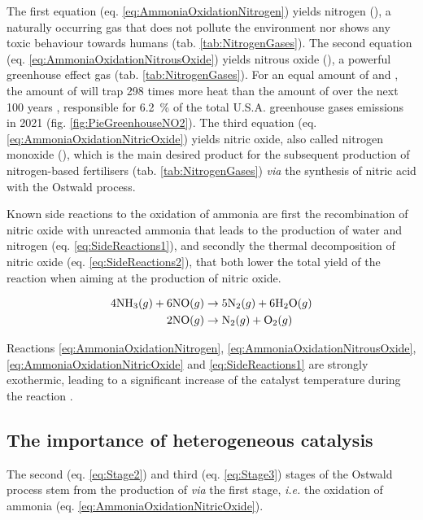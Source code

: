 The first equation (eq. \ref{eq:AmmoniaOxidationNitrogen}) yields nitrogen (\nitrogen), a naturally occurring gas that does not pollute the environment nor shows any toxic behaviour towards humans (tab. \ref{tab:NitrogenGases}).
The second equation (eq. \ref{eq:AmmoniaOxidationNitrousOxide}) yields nitrous oxide (\nitrousoxide), a powerful greenhouse effect gas (tab. \ref{tab:NitrogenGases}).
For an equal amount of  and , the amount of  will trap 298 times more heat than the amount of \carbondioxide over the next 100 years \parencite{MITCLIMATE}, responsible for \qty{6.2}{\percent} of the total U.S.A. greenhouse gases emissions in 2021 (fig. \ref{fig:PieGreenhouseNO2}).
The third equation (eq. \ref{eq:AmmoniaOxidationNitricOxide}) yields nitric oxide, also called nitrogen monoxide (\nitricoxide), which is the main desired product for the subsequent production of nitrogen-based fertilisers (tab. \ref{tab:NitrogenGases}) \textit{via} the synthesis of nitric acid with the Ostwald process.

Known side reactions to the oxidation of ammonia are first the recombination of nitric oxide with unreacted ammonia that leads to the production of water and nitrogen (eq. \ref{eq:SideReactions1}), and secondly the thermal decomposition of nitric oxide (eq. \ref{eq:SideReactions2}), that both lower the total yield of the reaction when aiming at the production of nitric oxide.

\begin{align}
    \label{eq:SideReactions1}
    4 \ammonia (g) + 6 \nitricoxide (g) & \rightarrow 5 \nitrogen (g) + 6 \water (g)\\
    \label{eq:SideReactions2}
    2 \nitricoxide (g) & \rightarrow \nitrogen (g) + \dioxygen (g)
\end{align}

Reactions \ref{eq:AmmoniaOxidationNitrogen}, \ref{eq:AmmoniaOxidationNitrousOxide}, \ref{eq:AmmoniaOxidationNitricOxide} and \ref{eq:SideReactions1} are strongly exothermic, leading to a significant increase of the catalyst temperature during the reaction \parencite{PerezRamirez2004, Hatscher2008}.

\subsection{The importance of heterogeneous catalysis}\label{sec:AmoOxiHC}

The second (eq. \ref{eq:Stage2}) and third (eq. \ref{eq:Stage3}) stages of the Ostwald process stem from the production of  \textit{via} the first stage, \textit{i.e.} the oxidation of ammonia (eq. \ref{eq:AmmoniaOxidationNitricOxide}).

